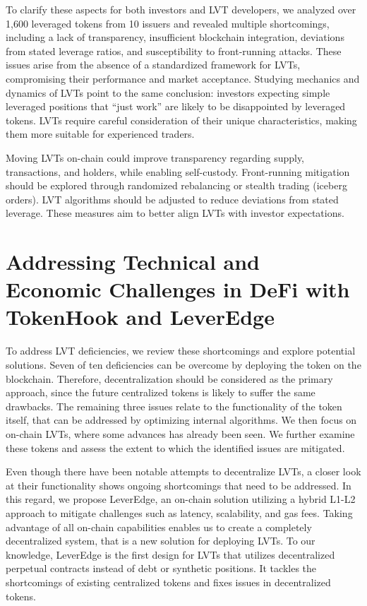 To clarify these aspects for both investors and LVT developers, we analyzed over 1,600 leveraged tokens from 10 issuers and revealed multiple shortcomings, including a lack of transparency, insufficient blockchain integration, deviations from stated leverage ratios, and susceptibility to front-running attacks. These issues arise from the absence of a standardized framework for LVTs, compromising their performance and market acceptance. Studying mechanics and dynamics of LVTs point to the same conclusion: investors expecting simple leveraged positions that ``just work'' are likely to be disappointed by leveraged tokens. LVTs require careful consideration of their unique characteristics, making them more suitable for experienced traders.

Moving LVTs on-chain could improve transparency regarding supply, transactions, and holders, while enabling self-custody. Front-running mitigation should be explored through randomized rebalancing or stealth trading (\eg iceberg orders). LVT algorithms should be adjusted to reduce deviations from stated leverage. These measures aim to better align LVTs with investor expectations.

\section{Addressing Technical and Economic Challenges in DeFi with TokenHook and LeverEdge}
To address LVT deficiencies, we review these shortcomings and explore potential solutions. Seven of ten deficiencies can be overcome by deploying the token on the blockchain. Therefore, decentralization should be considered as the primary approach, since the future centralized tokens is likely to suffer the same drawbacks. The remaining three issues relate to the functionality of the token itself, that can be addressed by optimizing internal algorithms. We then focus on on-chain LVTs, where some advances has already been seen. We further examine these tokens and assess the extent to which the identified issues are mitigated.

Even though there have been notable attempts to decentralize LVTs, a closer look at their functionality shows ongoing shortcomings that need to be addressed. In this regard, we propose LeverEdge, an on-chain solution utilizing a hybrid L1-L2 approach to mitigate challenges such as latency, scalability, and gas fees. Taking advantage of all on-chain capabilities enables us to create a completely decentralized system, that is a new solution for deploying LVTs. To our knowledge, LeverEdge is the first design for LVTs that utilizes decentralized perpetual contracts instead of debt or synthetic positions. It tackles the shortcomings of existing centralized tokens and fixes issues in decentralized tokens.

